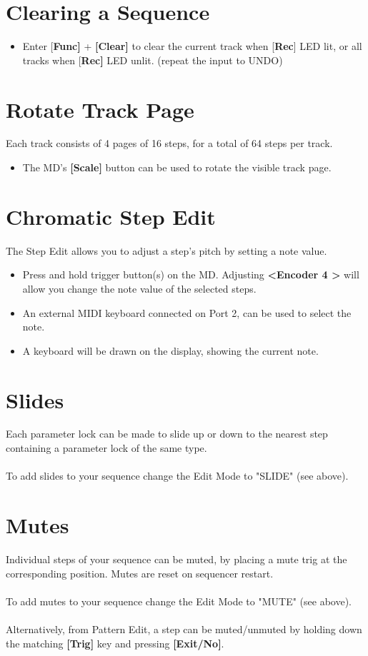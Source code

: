 \section{Clearing a Sequence}
\begin{itemize}
\item Enter [\textbf{Func]} + \textbf{[Clear]} to clear the current track when [\textbf{Rec}] LED lit, or all tracks when [\textbf{Rec]} LED unlit. (repeat the input to UNDO)
\end{itemize}
\section{Rotate Track Page}
Each track consists of 4 pages of 16 steps, for a total of 64 steps per track.
\begin{itemize}
\item The MD's \textbf{[Scale]} button can be used to rotate the visible track page.
\end{itemize}
\section{Chromatic Step Edit}
The Step Edit allows you to adjust a step's pitch by setting a note value. 
\begin{itemize}
\item Press and hold trigger button(s) on the MD. Adjusting \textbf{<Encoder 4 >} will allow you change the note value of the selected steps.
\item An external MIDI keyboard connected on Port 2, can be used to select the note.
\item A keyboard will be drawn on the display, showing the current note.
\end{itemize}
\section{Slides}
Each parameter lock can be made to slide up or down to the nearest step containing a parameter lock of the same type.
\\\\
To add slides to your sequence change the Edit Mode to "SLIDE" (see above).
\section{Mutes}
Individual steps of your sequence can be muted, by placing a mute trig at the corresponding position. Mutes are reset on sequencer restart.\\\\ 
To add mutes to your sequence change the Edit Mode to "MUTE" (see above).\\\\
Alternatively, from Pattern Edit, a step can be muted/unmuted by holding down the matching \textbf{[Trig]} key and pressing \textbf{[Exit/No]}.

